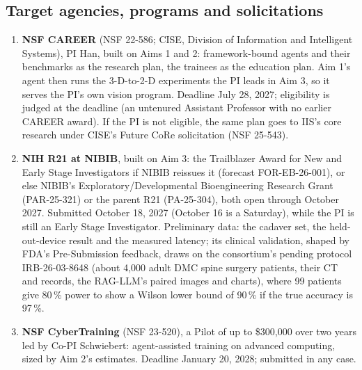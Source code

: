 \documentclass[10pt,letterpaper]{article}
\newcommand{\pct}{\,\%}
\begin{document}
\subsection*{Target agencies, programs and solicitations}
\begin{enumerate}[leftmargin=1.3em]
\item \textbf{NSF CAREER} (NSF 22-586; CISE, Division of Information and Intelligent Systems), PI Han, built on Aims 1 and 2:
framework-bound agents and their benchmarks as the research
plan, the trainees as the education plan. Aim 1's agent then runs the 3-D-to-2-D experiments the PI leads in Aim 3,
  so it serves the PI's own vision program. Deadline July 28, 2027; eligibility is judged at the deadline (an untenured Assistant Professor with no
  earlier CAREER award). If the PI is not eligible, the
  same plan goes to IIS's core research under CISE's Future CoRe solicitation (NSF 25-543).
\item \textbf{NIH R21 at NIBIB}, built on Aim 3: the Trailblazer Award for New and Early Stage Investigators if
  NIBIB reissues it (forecast FOR-EB-26-001), or else NIBIB's Exploratory/Developmental Bioengineering Research Grant
  (PAR-25-321) or the parent R21 (PA-25-304), both open through October 2027. Submitted October 18, 2027 (October 16 is a Saturday),
while the PI is still an Early Stage Investigator. Preliminary data:
  the cadaver set, the held-out-device result and the measured latency; its clinical validation, shaped by FDA's Pre-Submission feedback, draws on the
  consortium's pending protocol IRB-26-03-8648 (about 4,000 adult DMC spine surgery patients, their CT and records,
  the RAG-LLM's paired images and charts), where 99 patients give 80\pct{} power to show a Wilson lower bound of 90\pct{} if the true accuracy is 97\pct{}.
\item \textbf{NSF CyberTraining} (NSF 23-520), a Pilot of up to \$300,000 over two years led by Co-PI Schwiebert:
  agent-assisted training on advanced computing, sized by Aim 2's estimates. Deadline January 20,
  2028; submitted in any case.
\end{enumerate}
\end{document}
